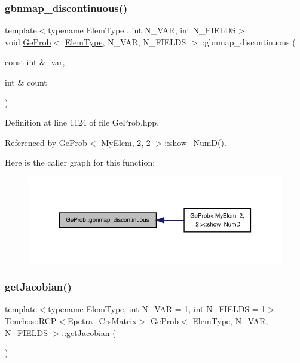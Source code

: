 \subsubsection{\texorpdfstring{gbnmap\+\_\+discontinuous()}{gbnmap\_discontinuous()}}
{\footnotesize\ttfamily template$<$typename Elem\+Type , int N\+\_\+\+V\+AR, int N\+\_\+\+F\+I\+E\+L\+DS$>$ \\
void \hyperlink{classGeProb}{Ge\+Prob}$<$ \hyperlink{spectral_8h_aaa2c1a7b2d1b12c590d730fe6ac839fa}{Elem\+Type}, N\+\_\+\+V\+AR, N\+\_\+\+F\+I\+E\+L\+DS $>$\+::gbnmap\+\_\+discontinuous (\begin{DoxyParamCaption}\item[{const int \&}]{ivar,  }\item[{int \&}]{count }\end{DoxyParamCaption})}



Definition at line 1124 of file Ge\+Prob.\+hpp.



Referenced by Ge\+Prob$<$ My\+Elem, 2, 2 $>$\+::show\+\_\+\+Num\+D().

Here is the caller graph for this function\+:
\nopagebreak
\begin{figure}[H]
\begin{center}
\leavevmode
\includegraphics[width=326pt]{classGeProb_a4ceec7b2e7cad8ba29dd8d751840a22b_icgraph}
\end{center}
\end{figure}
\mbox{\label{classGeProb_a5c8159fd807c26eaec5c0a9fa72636f6}} 
\subsubsection{\texorpdfstring{get\+Jacobian()}{getJacobian()}}
{\footnotesize\ttfamily template$<$typename Elem\+Type, int N\+\_\+\+V\+AR = 1, int N\+\_\+\+F\+I\+E\+L\+DS = 1$>$ \\
Teuchos\+::\+R\+CP$<$Epetra\+\_\+\+Crs\+Matrix$>$ \hyperlink{classGeProb}{Ge\+Prob}$<$ \hyperlink{spectral_8h_aaa2c1a7b2d1b12c590d730fe6ac839fa}{Elem\+Type}, N\+\_\+\+V\+AR, N\+\_\+\+F\+I\+E\+L\+DS $>$\+::get\+Jacobian (\begin{DoxyParamCaption}{ }\end{DoxyParamCaption})}



